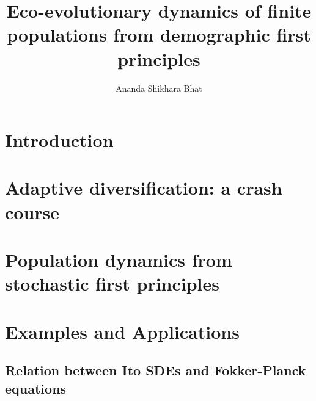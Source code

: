 \documentclass[twoside, 12pt]{iiser-thesis}
\title{Eco-evolutionary dynamics of finite populations from demographic first principles}
\author{Ananda Shikhara Bhat}
\begin{document}
\thesisfront
\listoftables
\listoffigures	
\chapter{Introduction}

\chapter{Adaptive diversification: a crash course}\label{chap_AD}

\chapter{Population dynamics from stochastic first principles}\label{chap_BD}

\chapter{Examples and Applications}\label{chap_examples}

% 
% 

\begin{appendices}
\chapter{Relation between Ito SDEs and Fokker-Planck equations}\label{App_SDE_FPE}

\end{appendices}
\printbibliography[title=References]
\end{document}
